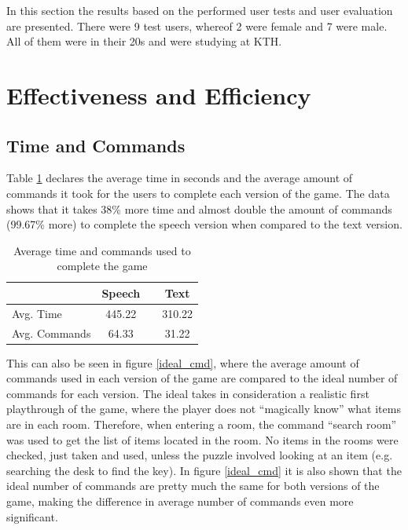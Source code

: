 In this section the results based on the performed user tests and user evaluation are presented. There were 9 test users, whereof 2 were female and 7 were male. All of them were in their 20s and were studying at KTH.

\section{Effectiveness and Efficiency}

\subsection{Time and Commands}
Table \ref{fig:avg_data} declares the average time in seconds and the average amount of commands it took for the users to complete each version of the game. The data shows that it takes 38\% more time and almost double the amount of commands (99.67\% more) to complete the speech version when compared to the text version.

\begin{table}[ht]
  \centering
  \begin{tabular}{l|ccc}
    \toprule
     & Speech &   & Text\\
    \midrule
    Avg. Time & 445.22 &   & 310.22\\
    Avg. Commands & 64.33 &   & 31.22\\
    \bottomrule
  \end{tabular}
  \caption{Average time and commands used to complete the game}\label{fig:avg_data}
\end{table}

This can also be seen in figure \ref{ideal_cmd}, where the average amount of commands used in each version of the game are compared to the ideal number of commands for each version. The ideal takes in consideration a realistic first playthrough of the game, where the player does not ``magically know'' what items are in each room. Therefore, when entering a room, the command “search room” was used to get the list of items located in the room. No items in the rooms were checked, just taken and used, unless the puzzle involved looking at an item (e.g. searching the desk to find the key). In figure \ref{ideal_cmd} it is also shown that the ideal number of commands are pretty much the same for both versions of the game, making the difference in average number of commands even more significant.

